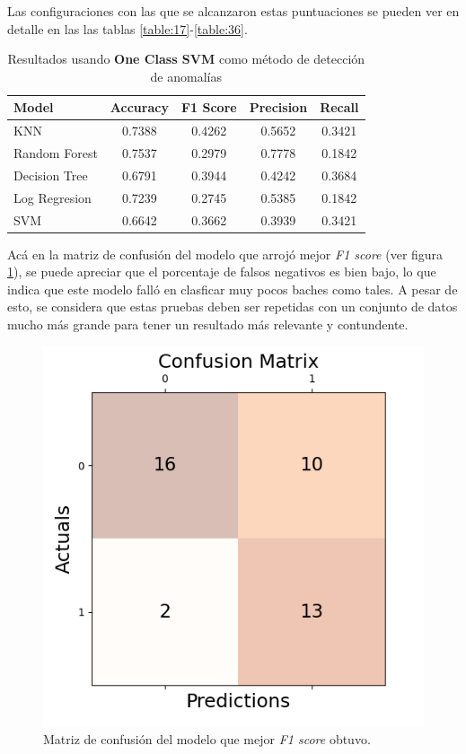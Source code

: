 	Las configuraciones con las que se alcanzaron estas puntuaciones se pueden ver en detalle en las las tablas \ref{table:17}-\ref{table:36}.

	\newpage
	\begin{table}[htb]
		\centering
		\caption{Resultados usando \textbf{One Class SVM} como método de detección de anomalías}
		\label{table:16}
		\begin{tabular}{lcccc}
		\toprule
				Model &  Accuracy &  F1 Score &  Precision &  Recall \\
		\midrule
				  KNN &    0.7388 &    0.4262 &     0.5652 &  0.3421 \\
		Random Forest &    0.7537 &    0.2979 &     0.7778 &  0.1842 \\
		Decision Tree &    0.6791 &    0.3944 &     0.4242 &  0.3684 \\
		Log Regresion &    0.7239 &    0.2745 &     0.5385 &  0.1842 \\
				  SVM &    0.6642 &    0.3662 &     0.3939 &  0.3421 \\
		\bottomrule
		\end{tabular}
	\end{table}

	Acá en la matriz de confusión del modelo que arrojó mejor \emph{F1 score} (ver figura \ref{fig:13}), se puede apreciar que el porcentaje de falsos
	negativos es bien bajo, lo que indica que este modelo falló en clasficar muy pocos baches como tales. A pesar de esto, se considera que estas pruebas 
	deben ser repetidas con un conjunto de datos mucho más grande para tener un resultado más relevante y contundente.

	\begin{figure}[htb]
		\centering
		\includegraphics[scale = 0.6]{Graphics/best_model_confusion_matrix.png}
		\caption{Matriz de confusión del modelo que mejor \emph{F1 score} obtuvo.}
		\label{fig:13}
	\end{figure}

